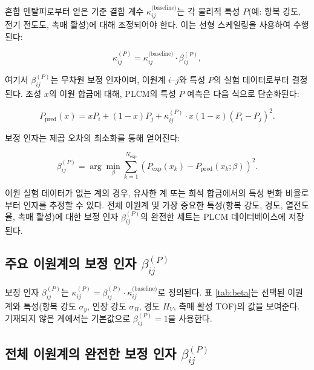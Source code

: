 \documentclass[12pt,a4paper]{article}
\begin{document}
	혼합 엔탈피로부터 얻은 기준 결합 계수 \(\kappa_{ij}^{\text{(baseline)}}\)는 각 물리적 특성 \(P\)(예: 항복 강도, 전기 전도도, 촉매 활성)에 대해 조정되어야 한다. 이는 선형 스케일링을 사용하여 수행된다:
	
	\begin{equation}
		\kappa_{ij}^{(P)} = \kappa_{ij}^{\text{(baseline)}} \cdot \beta_{ij}^{(P)},
		\label{eq:kappa-calibration}
	\end{equation}
	
	여기서 \(\beta_{ij}^{(P)}\)는 무차원 보정 인자이며, 이원계 \(i\)–\(j\)와 특성 \(P\)의 실험 데이터로부터 결정된다. 조성 \(x\)의 이원 합금에 대해, PLCM의 특성 \(P\) 예측은 다음 식으로 단순화된다:
	
	\begin{equation}
		P_{\text{pred}}(x) = x P_i + (1-x) P_j + \kappa_{ij}^{(P)} \cdot x(1-x) (P_i - P_j)^2.
		\label{eq:binary-prediction}
	\end{equation}
	
	보정 인자는 제곱 오차의 최소화를 통해 얻어진다:
	
	\begin{equation}
		\beta_{ij}^{(P)} = \arg\min_{\beta} \sum_{k=1}^{N_{\text{exp}}} \left( P_{\text{exp}}(x_k) - P_{\text{pred}}(x_k;\beta) \right)^2.
		\label{eq:beta-optimization}
	\end{equation}
	
	이원 실험 데이터가 없는 계의 경우, 유사한 계 또는 희석 합금에서의 특성 변화 비율로부터 인자를 추정할 수 있다. 전체 이원계 및 가장 중요한 특성(항복 강도, 경도, 열전도율, 촉매 활성)에 대한 보정 인자 \(\beta_{ij}^{(P)}\)의 완전한 세트는 PLCM 데이터베이스에 저장된다.
	
	\subsection{주요 이원계의 보정 인자 \(\beta_{ij}^{(P)}\)}
	\label{subsec:beta-table}
	
	보정 인자 \(\beta_{ij}^{(P)}\)는 \(\kappa_{ij}^{(P)} = \beta_{ij}^{(P)} \cdot \kappa_{ij}^{\text{(baseline)}}\)로 정의된다. 표 \ref{tab:beta}는 선택된 이원계와 특성(항복 강도 \(\sigma_y\), 인장 강도 \(\sigma_B\), 경도 \(H_V\), 촉매 활성 TOF)의 값을 보여준다. 기재되지 않은 계에서는 기본값으로 \(\beta_{ij}^{(P)} = 1\)을 사용한다.
	
	\subsection{전체 이원계의 완전한 보정 인자 \(\beta_{ij}^{(P)}\)}
	\label{subsec:beta-full}
	
\end{document}
